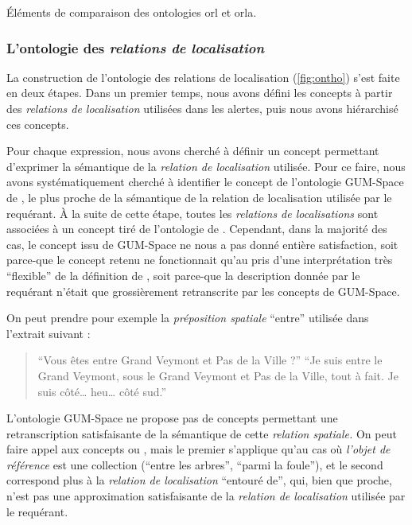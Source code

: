 \begin{table}
  \centering
  
  \caption{Éléments de comparaison des ontologies \ac{orl} et
    \ac{orla}.}
  \label{tab:orl_vs_orla}
\end{table}

\subsubsection{L'ontologie des \emph{relations de localisation}}

La construction de l'ontologie des relations de localisation
(\autoref{fig:ontho}) s'est faite en deux étapes. Dans un premier
temps, nous avons défini les concepts à partir des \emph{relations de
  localisation} utilisées dans les alertes, puis nous avons
hiérarchisé ces concepts.

Pour chaque expression, nous avons cherché à définir un concept
permettant d'exprimer la sémantique de la \emph{relation de
  localisation} utilisée.
%
Pour ce faire, nous avons systématiquement cherché à identifier le
concept de l'ontologie GUM-Space de \textcite{Bateman2010}, le plus
proche de la sémantique de la relation de localisation utilisée par le
requérant.
%
À la suite de cette étape, toutes les \emph{relations de
  localisations} sont associées à un concept tiré de l'ontologie de
\textcite{Bateman2010}. Cependant, dans la majorité des cas, le
concept issu de GUM-Space ne nous a pas donné entière satisfaction,
soit parce-que le concept retenu ne fonctionnait qu'au pris d'une
interprétation très \enquote{flexible} de la définition de
\textcite{Bateman2010}, soit parce-que la description donnée par le
requérant n'était que grossièrement retranscrite par les concepts de
GUM-Space.

On peut prendre pour exemple la \emph{préposition spatiale}
\enquote{entre} utilisée dans l'extrait suivant :
%
\begin{quote}
  \begin{dialogue}
    \Sec \enquote{Vous êtes entre Grand Veymont et Pas de la Ville ?}
    \Req \enquote{Je suis entre le Grand Veymont, sous le Grand
      Veymont et Pas de la Ville, tout à fait. Je suis côté… heu… côté
      sud.}
  \end{dialogue}
\end{quote}
%
L'ontologie GUM-Space ne propose pas de concepts permettant une
retranscription satisfaisante de la sémantique de cette \emph{relation
  spatiale.} On peut faire appel aux concepts
 ou , mais le
premier s'applique qu'au cas où \emph{l'objet de référence} est une
collection (\eg \enquote{entre les arbres}, \enquote{parmi la foule}),
et le second correspond plus à la \emph{relation de localisation}
\enquote{entouré de}, qui, bien que proche, n'est pas une
approximation satisfaisante de la \emph{relation de localisation}
utilisée par le requérant.

